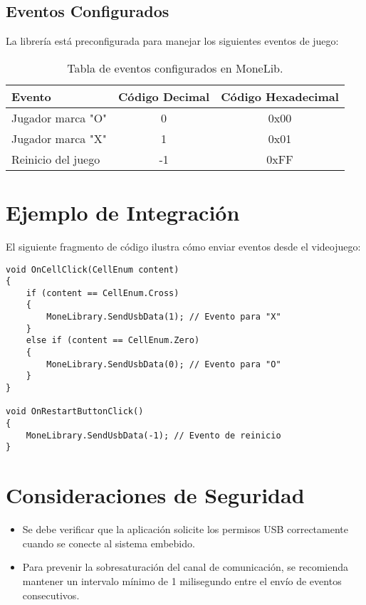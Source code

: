 \subsection*{Eventos Configurados}
La librería está preconfigurada para manejar los siguientes eventos de juego:

\begin{table}[h!]
\centering
\begin{tabular}{|l|c|c|}
\hline
\textbf{Evento} & \textbf{Código Decimal} & \textbf{Código Hexadecimal} \\ \hline
Jugador marca "O" & 0 & 0x00 \\ \hline
Jugador marca "X" & 1 & 0x01 \\ \hline
Reinicio del juego & -1 & 0xFF \\ \hline
\end{tabular}
\caption{Tabla de eventos configurados en MoneLib.}
\label{tab:eventos_monelib}
\end{table}

\section*{Ejemplo de Integración}
El siguiente fragmento de código ilustra cómo enviar eventos desde el videojuego:

\begin{lstlisting}[language=CSharp, caption={Ejemplo de implementación de envío de eventos.}, label={code:monelib_example}]
void OnCellClick(CellEnum content)
{
    if (content == CellEnum.Cross)
    {
        MoneLibrary.SendUsbData(1); // Evento para "X"
    }
    else if (content == CellEnum.Zero)
    {
        MoneLibrary.SendUsbData(0); // Evento para "O"
    }
}

void OnRestartButtonClick()
{
    MoneLibrary.SendUsbData(-1); // Evento de reinicio
}
\end{lstlisting}

\section*{Consideraciones de Seguridad}
\begin{itemize}
    \item Se debe verificar que la aplicación solicite los permisos USB correctamente cuando se conecte al sistema embebido.
    \item Para prevenir la sobresaturación del canal de comunicación, se recomienda mantener un intervalo mínimo de 1 milisegundo entre el envío de eventos consecutivos.
\end{itemize}